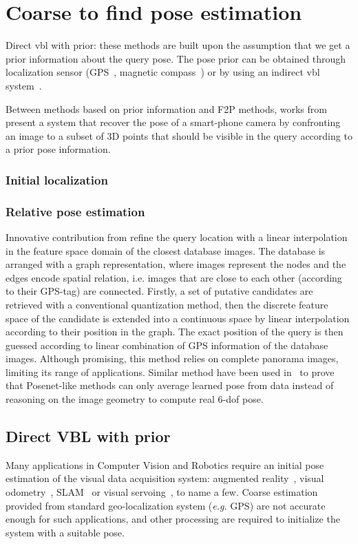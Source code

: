 \section{Coarse to find pose estimation}


Direct \ac{vbl} with prior: these methods are built upon the assumption that we get a prior information about the query pose. The pose prior can be obtained through localization sensor (GPS~\citep{Chen2011,Arth2015,Poglitsch2015}, magnetic compass~\citep{Svarm2014,Zeisl2015,Svarm2016}) or by using an indirect \ac{vbl} system~\citep{Torii2011,Song2016,Sattler2017}.

Between methods based on prior information and F2P methods, works from \citet{Arth2009} present a system that recover the pose of a smart-phone camera by confronting an image to a subset of 3D points that should be visible in the query according to a prior pose information.

\subsubsection{Initial localization}

\subsubsection{Relative pose estimation}

Innovative contribution from \citet{Torii2011} refine the query location with a linear interpolation in the feature space domain of the closest database images. The database is arranged with a graph representation, where images represent the nodes and the edges encode spatial relation, i.e. images that are close to each other (according to their GPS-tag) are connected. Firstly, a set of putative candidates are retrieved with a conventional quantization method, then the discrete feature space of the candidate is extended into a continuous space by linear interpolation according to their position in the graph. The exact position of the query is then guessed according to linear combination of GPS information of the database images. Although promising, this method relies on complete panorama images, limiting its range of applications. Similar method have been used in~\citep{Sattler2019} to prove that Posenet-like methods can only average learned pose from data instead of reasoning on the image geometry to compute real 6-\ac{dof} pose.


\subsection{Direct VBL with prior}
\label{vbl_prior}
Many applications in Computer Vision and Robotics require an initial  pose estimation of the visual data acquisition system: augmented reality~\citep{Arth2015}, visual odometry~\citep{Pascoe2015a}, SLAM~\citep{Milford2012} or visual servoing~\citep{Marchand2016}, to name a few. Coarse estimation provided from standard geo-localization system (\textit{e.g.} GPS) are not accurate enough for such applications, and other processing are required to initialize the system with a suitable pose.

